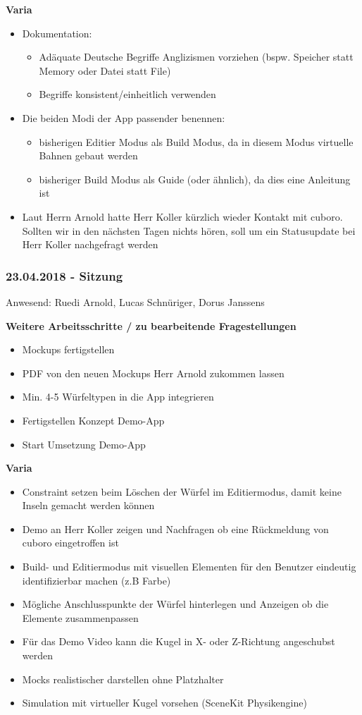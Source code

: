 \textbf{Varia}
\begin{itemize}
	\item Dokumentation:
	\begin{itemize}
		\item Adäquate Deutsche Begriffe Anglizismen vorziehen (bspw. Speicher statt Memory oder Datei statt File)
		\item Begriffe konsistent/einheitlich verwenden
	\end{itemize}
	\item Die beiden Modi der App passender benennen:
	\begin{itemize}
		\item bisherigen Editier Modus als Build Modus, da in diesem Modus virtuelle Bahnen gebaut werden
		\item bisheriger Build Modus als Guide (oder ähnlich), da dies eine Anleitung ist
	\end{itemize}
	\item Laut Herrn Arnold hatte Herr Koller kürzlich wieder Kontakt mit cuboro. Sollten wir in den nächsten Tagen nichts hören, soll um ein Statusupdate bei Herr Koller nachgefragt werden
\end{itemize}


\subsubsection*{23.04.2018 - Sitzung}

Anwesend: Ruedi Arnold, Lucas Schnüriger, Dorus Janssens

\textbf{Weitere Arbeitsschritte / zu bearbeitende Fragestellungen}
\begin{itemize}
	\item Mockups fertigstellen
	\item PDF von den neuen Mockups Herr Arnold zukommen lassen
	\item Min. 4-5 Würfeltypen in die App integrieren
	\item Fertigstellen Konzept Demo-App
	\item Start Umsetzung Demo-App
\end{itemize}

\textbf{Varia}
\begin{itemize}
	\item Constraint setzen beim Löschen der Würfel im Editiermodus, damit keine Inseln gemacht werden können
	\item Demo an Herr Koller zeigen und Nachfragen ob eine Rückmeldung von cuboro eingetroffen ist
	\item Build- und Editiermodus mit visuellen Elementen für den Benutzer eindeutig identifizierbar machen (z.B Farbe)
	\item Mögliche Anschlusspunkte der Würfel hinterlegen und Anzeigen ob die Elemente zusammenpassen
	\item Für das Demo Video kann die Kugel in X- oder Z-Richtung angeschubst werden
	\item Mocks realistischer darstellen ohne Platzhalter  
	\item Simulation mit virtueller Kugel vorsehen (SceneKit Physikengine)
\end{itemize}

